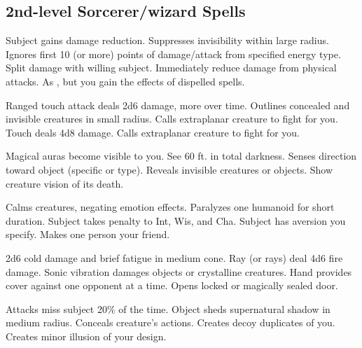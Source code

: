 \subsection{2nd-level Sorcerer/wizard Spells} 
\begin{swspelllist}
   Subject gains damage reduction.
   Suppresses invisibility within large radius.
   Ignores first 10 (or more) points of damage/attack from specified energy type.
   Split damage with willing subject.
   Immediately reduce damage from physical attacks.
   As , but you gain the effects of dispelled spells.

   Ranged touch attack deals 2d6 damage, more over time.
   Outlines concealed and invisible creatures in small radius.
   Calls extraplanar creature to fight for you.
   Touch deals 4d8 damage.
   Calls extraplanar creature to fight for you.

   Magical auras become visible to you.
   See 60 ft. in total darkness.
   Senses direction toward object (specific or type).
   Reveals invisible creatures or objects.
   Show creature vision of its death.
  \spellheadrestricted{}

   Calms creatures, negating emotion effects.
   Paralyzes one humanoid for short duration.
   Subject takes  penalty to Int, Wis, and Cha.
   Subject has aversion you specify.
   Makes one person your friend.

   2d6 cold damage and brief fatigue in medium cone.
   Ray (or rays) deal 4d6 fire damage.
   Sonic vibration damages objects or crystalline creatures.
   Hand provides cover against one opponent at a time.
   Opens locked or magically sealed door.

   Attacks miss subject 20\% of the time.
   Object sheds supernatural shadow in medium radius.
   Conceals creature's actions. 
   Creates decoy duplicates of you.
   Creates minor illusion of your design.


\end{swspelllist}
